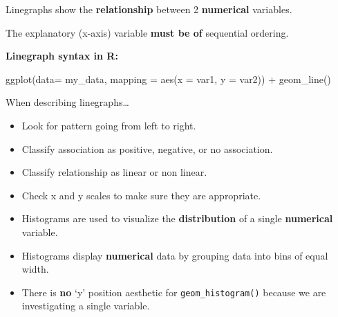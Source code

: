 \documentclass[
  letterpaper,
  DIV=11,
  numbers=noendperiod]{scrreprt}
\newenvironment{Shaded}{\begin{snugshade}}{\end{snugshade}}
\newcommand{\AttributeTok}[1]{\textcolor[rgb]{0.40,0.45,0.13}{#1}}
\newcommand{\FunctionTok}[1]{\textcolor[rgb]{0.28,0.35,0.67}{#1}}
\newcommand{\NormalTok}[1]{\textcolor[rgb]{0.00,0.23,0.31}{#1}}
\newcommand{\SpecialCharTok}[1]{\textcolor[rgb]{0.37,0.37,0.37}{#1}}
\providecommand{\tightlist}{%
  \setlength{\itemsep}{0pt}\setlength{\parskip}{0pt}}\usepackage{longtable,booktabs,array}
\begin{document}
\begin{tcolorbox}[enhanced jigsaw, breakable, colback=white, bottomrule=.15mm, leftrule=.75mm, colframe=quarto-callout-note-color-frame, arc=.35mm, rightrule=.15mm, toprule=.15mm, left=2mm, opacityback=0]

Linegraphs show the \textbf{relationship} between 2 \textbf{numerical}
variables.

The explanatory (x-axis) variable \textbf{must be of} sequential
ordering.

\textbf{Linegraph syntax in R:}

\begin{Shaded}
\begin{Highlighting}[]
\FunctionTok{ggplot}\NormalTok{(}\AttributeTok{data=}\NormalTok{ my\_data, }\AttributeTok{mapping =} \FunctionTok{aes}\NormalTok{(}\AttributeTok{x =}\NormalTok{ var1, }\AttributeTok{y =}\NormalTok{ var2)) }\SpecialCharTok{+}
  \FunctionTok{geom\_line}\NormalTok{()}
\end{Highlighting}
\end{Shaded}

\end{tcolorbox}

\begin{tcolorbox}[enhanced jigsaw, breakable, colback=white, bottomrule=.15mm, leftrule=.75mm, colframe=quarto-callout-note-color-frame, arc=.35mm, rightrule=.15mm, toprule=.15mm, left=2mm, opacityback=0]

When describing linegraphs\ldots{}

\begin{itemize}
\tightlist
\item
  Look for pattern going from left to right.
\item
  Classify association as positive, negative, or no association.
\item
  Classify relationship as linear or non linear.
\item
  Check x and y scales to make sure they are appropriate.
\end{itemize}

\end{tcolorbox}

\begin{tcolorbox}[enhanced jigsaw, breakable, colback=white, bottomrule=.15mm, leftrule=.75mm, colframe=quarto-callout-note-color-frame, arc=.35mm, rightrule=.15mm, toprule=.15mm, left=2mm, opacityback=0]

\begin{itemize}
\item
  Histograms are used to visualize the \textbf{distribution} of a single
  \textbf{numerical} variable.
\item
  Histograms display \textbf{numerical} data by grouping data into bins
  of equal width.
\item
  There is \textbf{no} `y' position aesthetic for
  \texttt{geom\_histogram()} because we are investigating a single
  variable.
\end{itemize}

\end{tcolorbox}
\end{document}
